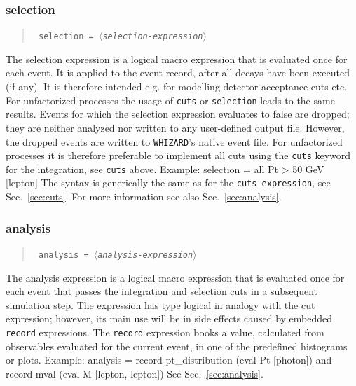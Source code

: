 \documentclass[12pt]{book}
\newenvironment{code}%
  {\begingroup\footnotesize
   \quote
   \verbatim}%
  {\endverbatim
   \endquote
   \endgroup\noindent}
\newenvironment{syntax}%
  {\begin{quote}
   \begin{flushleft}\tt}%
  {\end{flushleft}
   \end{quote}}
\newcommand{\var}[1]{$\langle$\textit{#1}$\rangle$}
\newcommand{\ttt}[1]{\texttt{#1}}
\newcommand{\whizard}{\texttt{WHIZARD}}
\begin{document}
\subsubsection{selection}
\begin{syntax}
selection = \var{selection-expression}
\end{syntax}
The selection expression is a logical macro expression that is evaluated once
for each event. It is applied to the event record,
after all decays have been executed (if any). It is therefore intended
e.g. for modelling detector acceptance cuts etc. For unfactorized
processes the usage of \texttt{cuts} or \texttt{selection} leads to
the same results. Events for which the selection expression evaluates
to false are dropped; they are neither analyzed nor written to any
user-defined output file. However, the dropped events are written to
\whizard's native event file. For unfactorized processes it is
therefore preferable to implement all cuts using the \texttt{cuts}
keyword for the integration, see \texttt{cuts} above. 
Example:
\begin{code}
selection = all Pt > 50 GeV [lepton]
\end{code}
The syntax is generically the same as for the \texttt{cuts
expression}, see Sec.~\ref{sec:cuts}. For more information see also
Sec.~\ref{sec:analysis}.


\subsubsection{analysis}
\begin{syntax}
analysis = \var{analysis-expression}
\end{syntax}
The analysis expression is a logical macro expression that is evaluated once
for each event that passes the integration and selection cuts in a
subsequent simulation step.  The
expression has type logical in analogy with the cut expression; however, its
main use will be in side effects caused by embedded \ttt{record} expressions.
The \ttt{record} expression books a value, calculated from observables
evaluated for the current event, in one of the predefined histograms or plots.
Example:
\begin{code}
analysis = record pt_distribution (eval Pt [photon])
      and  record mval (eval M [lepton, lepton])
\end{code}
See Sec.~\ref{sec:analysis}.
\end{document}
